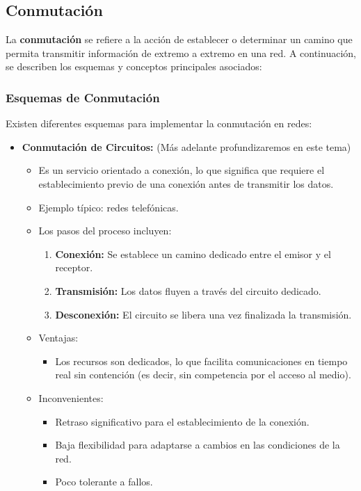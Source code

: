 \documentclass[a4paper,12pt]{article}
\begin{document}
\subsection{Conmutación}

La \textbf{conmutación} se refiere a la acción de establecer o determinar un camino que permita transmitir información de extremo a extremo en una red. A continuación, se describen los esquemas y conceptos principales asociados:

\subsubsection*{Esquemas de Conmutación}

Existen diferentes esquemas para implementar la conmutación en redes:
\begin{itemize}
    \item \textbf{Conmutación de Circuitos:} (Más adelante profundizaremos en este tema)
    \begin{itemize}
        \item Es un servicio orientado a conexión, lo que significa que requiere el establecimiento previo de una conexión antes de transmitir los datos.
        \item Ejemplo típico: redes telefónicas.
        \item Los pasos del proceso incluyen:
        \begin{enumerate}
            \item \textbf{Conexión:} Se establece un camino dedicado entre el emisor y el receptor.
            \item \textbf{Transmisión:} Los datos fluyen a través del circuito dedicado.
            \item \textbf{Desconexión:} El circuito se libera una vez finalizada la transmisión.
        \end{enumerate}
        \item Ventajas:
        \begin{itemize}
            \item Los recursos son dedicados, lo que facilita comunicaciones en tiempo real sin contención (es decir, sin competencia por el acceso al medio).
        \end{itemize}
        \item Inconvenientes:
        \begin{itemize}
            \item Retraso significativo para el establecimiento de la conexión.
            \item Baja flexibilidad para adaptarse a cambios en las condiciones de la red.
            \item Poco tolerante a fallos.
        \end{itemize}
    \end{itemize}


\end{itemize}
\end{document}
